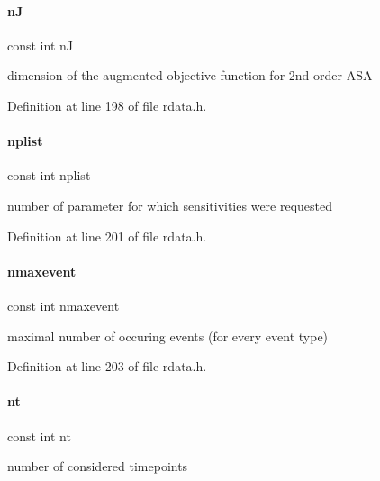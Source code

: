 \paragraph{\texorpdfstring{nJ}{nJ}}
{\footnotesize\ttfamily const int nJ}

dimension of the augmented objective function for 2nd order A\+SA 

Definition at line 198 of file rdata.\+h.

\mbox{\label{classamici_1_1_return_data_a2375af1667e955ed7a61ade0868f735a}} 
\paragraph{\texorpdfstring{nplist}{nplist}}
{\footnotesize\ttfamily const int nplist}

number of parameter for which sensitivities were requested 

Definition at line 201 of file rdata.\+h.

\mbox{\label{classamici_1_1_return_data_a48832d4f3a37c4fd75cc7f4ef578d1b1}} 
\paragraph{\texorpdfstring{nmaxevent}{nmaxevent}}
{\footnotesize\ttfamily const int nmaxevent}

maximal number of occuring events (for every event type) 

Definition at line 203 of file rdata.\+h.

\mbox{\label{classamici_1_1_return_data_a21dcbe77c07eeefce79fcacdbe5f1262}} 
\paragraph{\texorpdfstring{nt}{nt}}
{\footnotesize\ttfamily const int nt}

number of considered timepoints 

